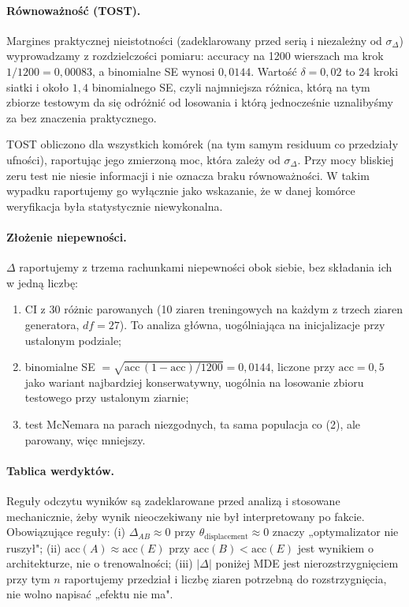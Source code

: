 \documentclass[11pt, a4paper]{article}
\begin{document}
\paragraph{Równoważność (TOST).} Margines praktycznej nieistotności (zadeklarowany przed serią i niezależny od $\sigma_\Delta$) wyprowadzamy z rozdzielczości pomiaru: accuracy na 1200 wierszach ma krok $1/1200 = 0{,}00083$, a binomialne SE wynosi $0{,}0144$. Wartość $\delta = 0{,}02$ to 24 kroki siatki i około $1{,}4$ binomialnego SE, czyli najmniejsza różnica, którą na tym zbiorze testowym da się odróżnić od losowania i którą jednocześnie uznalibyśmy za bez znaczenia praktycznego.

TOST obliczono dla wszystkich komórek (na tym samym residuum co przedziały ufności), raportując jego zmierzoną moc, która zależy od $\sigma_\Delta$. Przy mocy bliskiej zeru test nie niesie informacji i nie oznacza braku równoważności. W takim wypadku raportujemy go wyłącznie jako wskazanie, że w danej komórce weryfikacja była statystycznie niewykonalna.

\paragraph{Złożenie niepewności.}
$\Delta$ raportujemy z trzema rachunkami niepewności obok siebie, bez składania ich w jedną liczbę:
\begin{enumerate}
    \item CI z 30 różnic parowanych (10 ziaren treningowych na każdym z trzech ziaren generatora, $df = 27$). To analiza główna, uogólniająca na inicjalizacje przy ustalonym podziale;
    \item binomialne SE $= \sqrt{\mathrm{acc}\,(1-\mathrm{acc})/1200} = 0{,}0144$, liczone przy $\mathrm{acc} = 0{,}5$ jako wariant najbardziej konserwatywny, uogólnia na losowanie zbioru testowego przy ustalonym ziarnie;
    \item test McNemara na parach niezgodnych, ta sama populacja co (2), ale parowany, więc mniejszy.
\end{enumerate}

\paragraph{Tablica werdyktów.}\label{sec:tablica-werdyktow} Reguły odczytu wyników są zadeklarowane przed analizą i stosowane mechanicznie, żeby wynik nieoczekiwany nie był interpretowany po fakcie. Obowiązujące reguły: (i) $\Delta_{AB} \approx 0$ przy $\theta_{\text{displacement}} \approx 0$ znaczy „optymalizator nie ruszył"; (ii) $\text{acc}(A) \approx \text{acc}(E)$ przy $\text{acc}(B) < \text{acc}(E)$ jest wynikiem o architekturze, nie o trenowalności; (iii) $|\Delta|$ poniżej MDE jest nierozstrzygnięciem przy tym $n$ raportujemy przedział i liczbę ziaren potrzebną do rozstrzygnięcia, nie wolno napisać „efektu nie ma".
\end{document}
